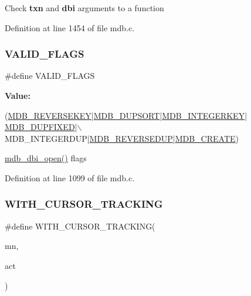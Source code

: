 Check {\bfseries txn} and {\bfseries dbi} arguments to a function 

Definition at line 1454 of file mdb.\+c.

\mbox{\label{group__internal_ga999f0ca5c5a7c2e736a21f3aab93cebc}} 
\subsubsection{\texorpdfstring{V\+A\+L\+I\+D\+\_\+\+F\+L\+A\+GS}{VALID\_FLAGS}}
{\footnotesize\ttfamily \#define V\+A\+L\+I\+D\+\_\+\+F\+L\+A\+GS}

{\bfseries Value\+:}
\begin{DoxyCode}
(\mbox{\hyperlink{group__mdb__dbi__open_gaea2d873575b7875771ea5296b4c85beb}{MDB\_REVERSEKEY}}|\mbox{\hyperlink{group__mdb__dbi__open_gae0626566c2562e9007f5c8c9535bab1a}{MDB\_DUPSORT}}|\mbox{\hyperlink{group__mdb__dbi__open_ga219c5c50d41902fca79c68d8836e7753}{MDB\_INTEGERKEY}}|
      \mbox{\hyperlink{group__mdb__dbi__open_ga5acc26f80668d1ebc31265d178c69338}{MDB\_DUPFIXED}}|\(\backslash\)
    MDB\_INTEGERDUP|\mbox{\hyperlink{group__mdb__dbi__open_gaf99ce592b75d65e23503f78a7933c297}{MDB\_REVERSEDUP}}|\mbox{\hyperlink{group__mdb__dbi__open_gafd47620cff55fb3ec7cd7501d4d1cb4a}{MDB\_CREATE}})
\end{DoxyCode}
\mbox{\hyperlink{group__internal_gac08cad5b096925642ca359a6d6f0562a}{mdb\+\_\+dbi\+\_\+open()}} flags 

Definition at line 1099 of file mdb.\+c.

\mbox{\label{group__internal_ga46281cc01f9a7bf2e999d993a88fa958}} 
\subsubsection{\texorpdfstring{W\+I\+T\+H\+\_\+\+C\+U\+R\+S\+O\+R\+\_\+\+T\+R\+A\+C\+K\+I\+NG}{WITH\_CURSOR\_TRACKING}}
{\footnotesize\ttfamily \#define W\+I\+T\+H\+\_\+\+C\+U\+R\+S\+O\+R\+\_\+\+T\+R\+A\+C\+K\+I\+NG(\begin{DoxyParamCaption}\item[{}]{mn,  }\item[{}]{act }\end{DoxyParamCaption})}

